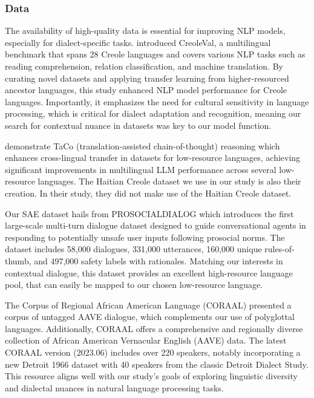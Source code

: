 \subsubsection{Data}

The availability of high-quality data is essential for improving NLP models, especially for dialect-specific tasks. \cite{Lent:24} introduced CreoleVal, a multilingual benchmark that spans 28 Creole languages and covers various NLP tasks such as reading comprehension, relation classification, and machine translation. By curating novel datasets and applying transfer learning from higher-resourced ancestor languages, this study enhanced NLP model performance for Creole languages. Importantly, it emphasizes the need for cultural sensitivity in language processing, which is critical for dialect adaptation and recognition, meaning our search for contextual nuance in datasets was key to our model function.

\cite{Upadhayay2024} demonstrate TaCo (translation-assisted chain-of-thought) reasoning which enhances cross-lingual transfer in datasets for low-resource languages, achieving significant improvements in multilingual LLM performance across several low-resource languages. The Haitian Creole dataset we use in our study is also their creation. In their study, they did not make use of the Haitian Creole dataset. 

Our SAE dataset hails from \cite{kim2022} PROSOCIALDIALOG which introduces the first large-scale multi-turn dialogue dataset designed to guide conversational agents in responding to potentially unsafe user inputs following prosocial norms. The dataset includes 58,000 dialogues, 331,000 utterances, 160,000 unique rules-of-thumb, and 497,000 safety labels with rationales. Matching our interests in contextual dialogue, this dataset provides an excellent high-resource language pool, that can easily be mapped to our chosen low-resource language.

 The Corpus of Regional African American Language (CORAAL) \cite{kendall23} presented a corpus of untagged AAVE dialogue, which complements our use of polyglottal languages. Additionally, CORAAL offers a comprehensive and regionally diverse collection of African American Vernacular English (AAVE) data. The latest CORAAL version (2023.06) includes over 220 speakers, notably incorporating a new Detroit 1966 dataset with 40 speakers from the classic Detroit Dialect Study. This resource aligns well with our study's goals of exploring linguistic diversity and dialectal nuances in natural language processing tasks.

